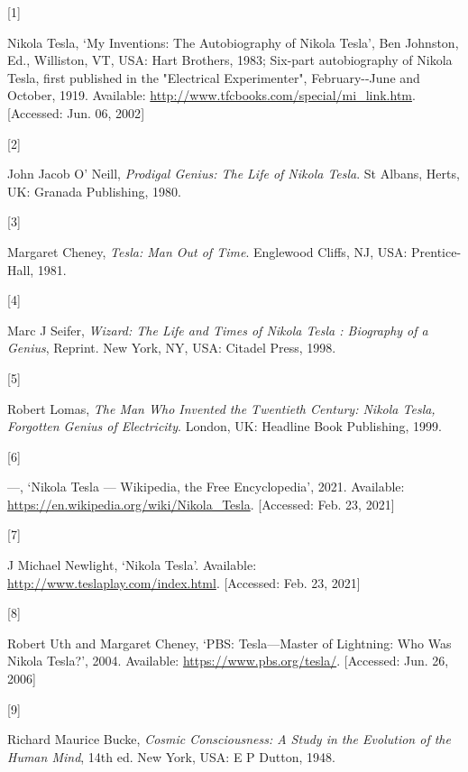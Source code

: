 \documentclass[
  a4paper,
]{article}
\newlength{\cslhangindent}
\newlength{\csllabelwidth}
\newlength{\cslentryspacingunit} %
\newenvironment{CSLReferences}[2] %
 {%
  \setlength{\parindent}{0pt}
  \ifodd #1
  \let\oldpar\par
  \def\par{\hangindent=\cslhangindent\oldpar}
  \fi
  \setlength{\parskip}{#2\cslentryspacingunit}
 }%
 {}
\newcommand{\CSLLeftMargin}[1]{\parbox[t]{\csllabelwidth}{#1}}
\newcommand{\CSLRightInline}[1]{\parbox[t]{\linewidth - \csllabelwidth}{#1}\break}
\begin{document}
\hypertarget{refs}{}
\begin{CSLReferences}{0}{0}
\leavevmode{}%
\CSLLeftMargin{{[}1{]} }%
\CSLRightInline{Nikola Tesla, {`{My Inventions: The Autobiography of
Nikola Tesla}'}, Ben Johnston, Ed., Williston, VT, USA: Hart Brothers,
1983; Six-part autobiography of Nikola Tesla, first published in the
"Electrical Experimenter", February-\/-June and October, 1919.
Available: \url{http://www.tfcbooks.com/special/mi_link.htm}.
{[}Accessed: Jun. 06, 2002{]}}

\leavevmode{}%
\CSLLeftMargin{{[}2{]} }%
\CSLRightInline{John Jacob O' Neill, \emph{{Prodigal Genius: The Life of
Nikola Tesla}}. St Albans, Herts, UK: Granada Publishing, 1980.}

\leavevmode{}%
\CSLLeftMargin{{[}3{]} }%
\CSLRightInline{Margaret Cheney, \emph{{Tesla: Man Out of Time}}.
Englewood Cliffs, NJ, USA: Prentice-Hall, 1981.}

\leavevmode{}%
\CSLLeftMargin{{[}4{]} }%
\CSLRightInline{Marc J Seifer, \emph{{Wizard: The Life and Times of
Nikola Tesla : Biography of a Genius}}, Reprint. New York, NY, USA:
Citadel Press, 1998.}

\leavevmode{}%
\CSLLeftMargin{{[}5{]} }%
\CSLRightInline{Robert Lomas, \emph{{The Man Who Invented the Twentieth
Century: Nikola Tesla, Forgotten Genius of Electricity}}. London, UK:
Headline Book Publishing, 1999.}

\leavevmode{}%
\CSLLeftMargin{{[}6{]} }%
\CSLRightInline{---, {`{N}ikola {T}esla --- {Wikipedia}{,} the {F}ree
{E}ncyclopedia'}, 2021. Available:
\url{https://en.wikipedia.org/wiki/Nikola_Tesla}. {[}Accessed: Feb. 23,
2021{]}}

\leavevmode{}%
\CSLLeftMargin{{[}7{]} }%
\CSLRightInline{J Michael Newlight, {`{Nikola Tesla}'}. Available:
\url{http://www.teslaplay.com/index.html}. {[}Accessed: Feb. 23,
2021{]}}

\leavevmode{}%
\CSLLeftMargin{{[}8{]} }%
\CSLRightInline{Robert Uth and Margaret Cheney, {`{PBS: Tesla---Master
of Lightning: Who Was Nikola Tesla?}'}, 2004. Available:
\url{https://www.pbs.org/tesla/}. {[}Accessed: Jun. 26, 2006{]}}

\leavevmode{}%
\CSLLeftMargin{{[}9{]} }%
\CSLRightInline{Richard Maurice Bucke, \emph{{Cosmic Consciousness: A
Study in the Evolution of the Human Mind}}, 14th ed. New York, USA: E P
Dutton, 1948.}


\end{CSLReferences}
\end{document}
